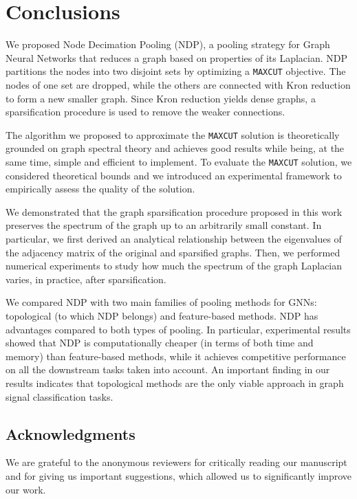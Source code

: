 \documentclass[journal]{IEEEtran}
\newcommand{\maxcut}{\texttt{\small{MAXCUT}}}
\begin{document}
\section{Conclusions}
\label{sec:conclusion}

We proposed Node Decimation Pooling (NDP), a pooling strategy for Graph Neural Networks that reduces a graph based on properties of its Laplacian. 
NDP partitions the nodes into two disjoint sets by optimizing a \maxcut{} objective. 
The nodes of one set are dropped, while the others are connected with Kron reduction to form a new smaller graph. 
Since Kron reduction yields dense graphs, a sparsification procedure is used to remove the weaker connections.

The algorithm we proposed to approximate the \maxcut{} solution is theoretically grounded on graph spectral theory and achieves good results while being, at the same time, simple and efficient to implement.
To evaluate the \maxcut{} solution, we considered theoretical bounds and we introduced an experimental framework to empirically assess the quality of the solution.

We demonstrated that the graph sparsification procedure proposed in this work preserves the spectrum of the graph up to an arbitrarily small constant.
In particular, we first derived an analytical relationship between the eigenvalues of the adjacency matrix of the original and sparsified graphs.
Then, we performed numerical experiments to study how much the spectrum of the graph Laplacian varies, in practice, after sparsification.

We compared NDP with two main families of pooling methods for GNNs: topological (to which NDP belongs) and feature-based methods.
NDP has advantages compared to both types of pooling. 
In particular, experimental results showed that NDP is computationally cheaper (in terms of both time and memory) than feature-based methods, while it achieves competitive performance on all the downstream tasks taken into account. 
An important finding in our results indicates that topological methods are the only viable approach in graph signal classification tasks.

\subsection*{Acknowledgments}
We are grateful to the anonymous reviewers for critically reading our manuscript and for giving us important suggestions, which allowed us to significantly improve our work.
\end{document}
